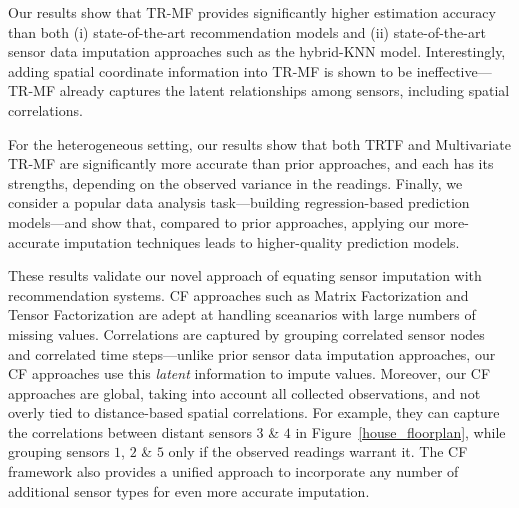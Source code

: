 Our results show that TR-MF provides significantly higher estimation accuracy than 
both (i) state-of-the-art recommendation models and (ii) state-of-the-art sensor data imputation approaches 
such as the hybrid-KNN model.
Interestingly, adding spatial coordinate information into TR-MF is shown to be ineffective---TR-MF already
captures the latent relationships among sensors, including spatial correlations.  

For the heterogeneous setting, our results show that both TRTF and
Multivariate TR-MF are significantly more accurate than prior
approaches, and each has its strengths, depending on the observed
variance in the readings.  Finally, we consider a popular data
analysis task---building regression-based prediction models---and show
that, compared to prior approaches, applying our more-accurate
imputation techniques leads to higher-quality prediction models.

These results validate our novel approach of equating sensor
imputation with recommendation systems.  CF approaches such as Matrix
Factorization and Tensor Factorization are adept at handling
sceanarios with large numbers of missing values.  Correlations are
captured by grouping correlated sensor nodes and correlated time
steps---unlike prior sensor data imputation approaches, our CF
approaches use this {\em latent} information to impute values.
Moreover, our CF approaches are global, taking into account all
collected observations, and not overly tied to distance-based spatial
correlations.  For example, they can capture the correlations between
distant sensors $3$ \& $4$ in Figure~\ref{house_floorplan}, while
grouping sensors $1$, $2$ \& $5$ only if the observed readings warrant
it.  The CF framework also provides a unified approach to incorporate
any number of additional sensor types for even more accurate imputation.






